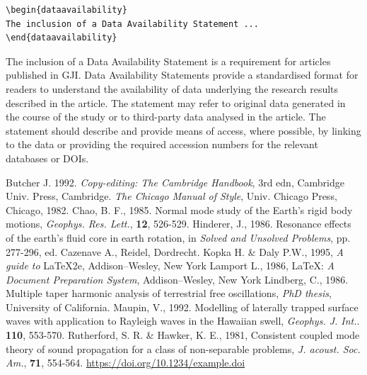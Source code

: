 \documentclass{gji}
\begin{document}
\begin{verbatim}
\begin{dataavailability}
The inclusion of a Data Availability Statement ...
\end{dataavailability}
\end{verbatim}


\begin{dataavailability}
The inclusion of a Data Availability Statement is a requirement for articles published in GJI. Data Availability Statements provide a standardised format for readers to understand the availability of data underlying the research results described in the article. The statement may refer to original data generated in the course of the study or to third-party data analysed in the article. The statement should describe and provide means of access, where possible, by linking to the data or providing the required accession numbers for the relevant databases or DOIs.
\end{dataavailability}


\begin{thebibliography}{}
    Butcher J. 1992. \textit{Copy-editing: The Cambridge
    Handbook}, 3rd edn, Cambridge Univ. Press, Cambridge.
   \textit{The Chicago Manual of Style}, Univ.
    Chicago Press, Chicago, 1982.
    Chao, B. F., 1985. Normal mode study of the Earth's rigid
     body motions, \textit{Geophys. Res. Lett.}, \textbf{12}, 526-529.
    Hinderer, J., 1986. Resonance effects of the earth's fluid
    core in earth rotation, in \textit{Solved and Unsolved
    Problems}, pp. 277-296, ed. Cazenave A., Reidel,
    Dordrecht.
    Kopka H. \& Daly P.W., 1995, \textit{A guide to} \LaTeX2e,
    Addison--Wesley, New York
    Lamport L., 1986,  \LaTeX: \textit{A Document
    Preparation System}, Addison--Wesley, New York
    Lindberg, C., 1986.  Multiple taper harmonic analysis of
    terrestrial free oscillations, \textit{PhD thesis},
    University of California.
    Maupin, V., 1992. Modelling of laterally trapped surface
    waves with application to Rayleigh waves in the Hawaiian
    swell, \textit{Geophys. J. Int.}. \textbf{110}, 553-570.
    Rutherford, S. R. \& Hawker, K. E., 1981,
    Consistent coupled mode theory of sound propagation for a
    class of non-separable problems,
   \textit{J. acoust. Soc. Am.}, \textbf{71}, 554-564.
   \url{https://doi.org/10.1234/example.doi}
\end{thebibliography}
\end{document}
